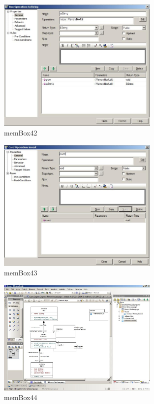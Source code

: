 \begin{figure}[htbp]
	\centering
  \includegraphics[width=0.7\textwidth]{pics/memBox42.png}
	\caption{memBox42}
	\label{memBox42}
\end{figure}

\begin{figure}[htbp]
	\centering
  \includegraphics[width=0.7\textwidth]{pics/memBox43.png}
	\caption{memBox43}
	\label{memBox43}
\end{figure}

\begin{figure}[htbp]
	\centering
  \includegraphics[width=0.7\textwidth]{pics/memBox44.png}
	\caption{memBox44}
	\label{memBox44}
\end{figure}

